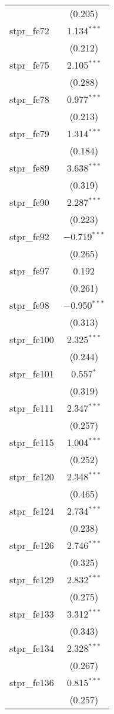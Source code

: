 \begin{table}[!htbp]
\begin{tabular}{@{\extracolsep{5pt}}lc}
  & (0.205) \\ 
  stpr\_fe72 & 1.134$^{***}$ \\ 
  & (0.212) \\ 
  stpr\_fe75 & 2.105$^{***}$ \\ 
  & (0.288) \\ 
  stpr\_fe78 & 0.977$^{***}$ \\ 
  & (0.213) \\ 
  stpr\_fe79 & 1.314$^{***}$ \\ 
  & (0.184) \\ 
  stpr\_fe89 & 3.638$^{***}$ \\ 
  & (0.319) \\ 
  stpr\_fe90 & 2.287$^{***}$ \\ 
  & (0.223) \\ 
  stpr\_fe92 & $-$0.719$^{***}$ \\ 
  & (0.265) \\ 
  stpr\_fe97 & 0.192 \\ 
  & (0.261) \\ 
  stpr\_fe98 & $-$0.950$^{***}$ \\ 
  & (0.313) \\ 
  stpr\_fe100 & 2.325$^{***}$ \\ 
  & (0.244) \\ 
  stpr\_fe101 & 0.557$^{*}$ \\ 
  & (0.319) \\ 
  stpr\_fe111 & 2.347$^{***}$ \\ 
  & (0.257) \\ 
  stpr\_fe115 & 1.004$^{***}$ \\ 
  & (0.252) \\ 
  stpr\_fe120 & 2.348$^{***}$ \\ 
  & (0.465) \\ 
  stpr\_fe124 & 2.734$^{***}$ \\ 
  & (0.238) \\ 
  stpr\_fe126 & 2.746$^{***}$ \\ 
  & (0.325) \\ 
  stpr\_fe129 & 2.832$^{***}$ \\ 
  & (0.275) \\ 
  stpr\_fe133 & 3.312$^{***}$ \\ 
  & (0.343) \\ 
  stpr\_fe134 & 2.328$^{***}$ \\ 
  & (0.267) \\ 
  stpr\_fe136 & 0.815$^{***}$ \\ 
  & (0.257) \\ 

\end{tabular}
\end{table}
